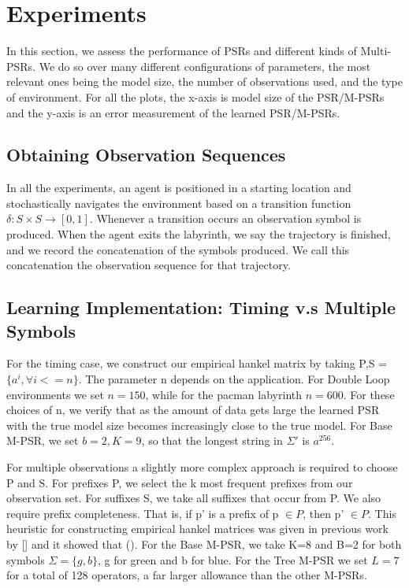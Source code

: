 \section{Experiments}
In this section, we assess the performance of PSRs and different kinds of Multi-PSRs. We do so over many different configurations of parameters, the most relevant ones being the model size, the number of observations used, and the type of environment. For all the plots, the x-axis is model size of the PSR/M-PSRs and the y-axis is an error measurement of the learned PSR/M-PSRs.

\subsection{Obtaining Observation Sequences}
In all the experiments, an agent is positioned in a starting location and stochastically navigates the environment based on a transition function $\delta:S \times S\rightarrow[0,1]$. Whenever a transition occurs an observation symbol is produced. When the agent exits the labyrinth, we say the trajectory is finished, and we record the concatenation of the symbols produced. We call this concatenation the observation sequence for that trajectory.  

\subsection{Learning Implementation: Timing v.s Multiple Symbols}

For the timing case, we construct our empirical hankel matrix by taking P,S = $\{a^i, \forall i<=n\}$. The parameter n depends on the application. For Double Loop environments we set $n = 150$, while for the pacman labyrinth $n = 600$. For these choices of n, we verify that as the amount of data gets large the learned PSR with the true model size becomes increasingly close to the true model. For Base M-PSR, we set $b=2,K=9$, so that the longest string in $\Sigma'$ is $a^{256}$.

For multiple observations a slightly more complex approach is required to choose P and S. For prefixes P, we select the k most frequent prefixes from our observation set. For suffixes S, we take all suffixes that occur from P. We also require prefix completeness. That is, if p' is a prefix of p $\in P$, then p' $\in P$. This heuristic for constructing empirical hankel matrices was given in previous work by [] and it showed that (). For the Base M-PSR, we take K=8 and B=2 for both symbols $\Sigma=\{g,b\}$, g for green and b for blue. For the Tree M-PSR we set $L=7$ for a total of 128 operators, a far larger allowance than the other M-PSRs. 

